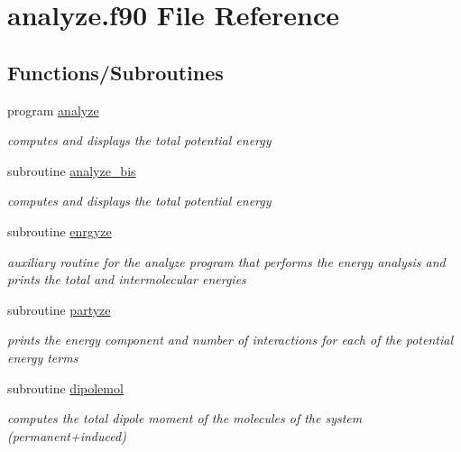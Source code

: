 \hypertarget{analyze_8f90}{\section{analyze.\-f90 File Reference}
\label{analyze_8f90}
}
\subsection*{Functions/\-Subroutines}
\begin{DoxyCompactItemize}
\item 
program \hyperlink{analyze_8f90_ad0571e0cf34d424af56a4981e316f8eb}{analyze}
\begin{DoxyCompactList}\small\item\em computes and displays the total potential energy \end{DoxyCompactList}\item 
subroutine \hyperlink{analyze_8f90_acce5eb003f35035aceaef44ca0b67e73}{analyze\-\_\-bis}
\begin{DoxyCompactList}\small\item\em computes and displays the total potential energy \end{DoxyCompactList}\item 
subroutine \hyperlink{analyze_8f90_a770ce3bad62e0a46d6df1a6176b244de}{enrgyze}
\begin{DoxyCompactList}\small\item\em auxiliary routine for the analyze program that performs the energy analysis and prints the total and intermolecular energies \end{DoxyCompactList}\item 
subroutine \hyperlink{analyze_8f90_a4211a1bfe52847f742c337d72507a093}{partyze}
\begin{DoxyCompactList}\small\item\em prints the energy component and number of interactions for each of the potential energy terms \end{DoxyCompactList}\item 
subroutine \hyperlink{analyze_8f90_a2b1e6b693ec6b1594a8408a0cf537daa}{dipolemol}
\begin{DoxyCompactList}\small\item\em computes the total dipole moment of the molecules of the system (permanent+induced) \end{DoxyCompactList}\end{DoxyCompactItemize}



